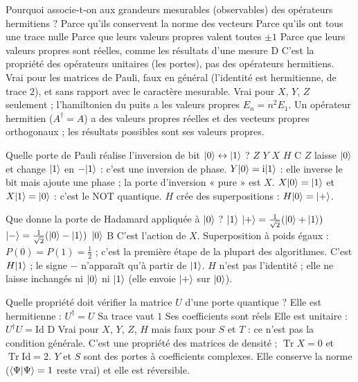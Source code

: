   {Pourquoi associe-t-on aux grandeurs mesurables (observables) des opérateurs hermitiens ?}
  {Parce qu'ils conservent la norme des vecteurs}
  {Parce qu'ils ont tous une trace nulle}
  {Parce que leurs valeurs propres valent toutes $\pm1$}
  {Parce que leurs valeurs propres sont réelles, comme les résultats d'une mesure}
  {D}
\qcmx
  {C'est la propriété des opérateurs unitaires (les portes), pas des opérateurs hermitiens.}
  {Vrai pour les matrices de Pauli, faux en général (l'identité est hermitienne, de trace $2$), et sans rapport avec le caractère mesurable.}
  {Vrai pour $X$, $Y$, $Z$ seulement ; l'hamiltonien du puits a les valeurs propres $E_n=n^2E_1$.}
  {Un opérateur hermitien ($A^\dagger=A$) a des valeurs propres réelles et des vecteurs propres orthogonaux ; les résultats possibles sont ses valeurs propres.}

  {Quelle porte de Pauli réalise l'inversion de bit $|0\rangle\leftrightarrow|1\rangle$ ?}
  {$Z$}
  {$Y$}
  {$X$}
  {$H$}
  {C}
\qcmx
  {$Z$ laisse $|0\rangle$ et change $|1\rangle$ en $-|1\rangle$ : c'est une inversion de phase.}
  {$Y|0\rangle=\mathrm{i}|1\rangle$ : elle inverse le bit mais ajoute une phase ; la porte d'inversion « pure » est $X$.}
  {$X|0\rangle=|1\rangle$ et $X|1\rangle=|0\rangle$ : c'est le NOT quantique.}
  {$H$ crée des superpositions : $H|0\rangle=|+\rangle$.}

  {Que donne la porte de Hadamard appliquée à $|0\rangle$ ?}
  {$|1\rangle$}
  {$|+\rangle=\frac{1}{\sqrt2}(|0\rangle+|1\rangle)$}
  {$|-\rangle=\frac{1}{\sqrt2}(|0\rangle-|1\rangle)$}
  {$|0\rangle$}
  {B}
\qcmx
  {C'est l'action de $X$.}
  {Superposition à poids égaux : $P(0)=P(1)=\frac12$ ; c'est la première étape de la plupart des algorithmes.}
  {C'est $H|1\rangle$ ; le signe $-$ n'apparaît qu'à partir de $|1\rangle$.}
  {$H$ n'est pas l'identité ; elle ne laisse inchangés ni $|0\rangle$ ni $|1\rangle$ (elle envoie $|+\rangle$ sur $|0\rangle$).}

  {Quelle propriété doit vérifier la matrice $U$ d'une porte quantique ?}
  {Elle est hermitienne : $U^\dagger=U$}
  {Sa trace vaut $1$}
  {Ses coefficients sont réels}
  {Elle est unitaire : $U^\dagger U=\mathrm{Id}$}
  {D}
\qcmx
  {Vrai pour $X$, $Y$, $Z$, $H$ mais faux pour $S$ et $T$ : ce n'est pas la condition générale.}
  {C'est une propriété des matrices de densité ; $\operatorname{Tr}X=0$ et $\operatorname{Tr}\mathrm{Id}=2$.}
  {$Y$ et $S$ sont des portes à coefficients complexes.}
  {Elle conserve la norme ($\langle \Psi|\Psi\rangle=1$ reste vrai) et elle est réversible.}

